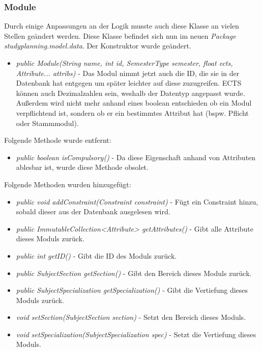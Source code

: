 \documentclass[parskip=full]{scrartcl}
\begin{document}
			\subsubsection{Module}
				Durch einige Anpassungen an der Logik musste auch diese Klasse an vielen Stellen geändert werden.
				Diese Klasse befindet sich nun im neuen \textit{Package studyplanning.model.data}.
				Der Konstruktor wurde geändert.
				\begin{itemize}
					\item \textit{public Module(String name, int id, SemesterType semester, float ects, Attribute... attribs)} - Das Modul nimmt jetzt auch die ID, die sie in der Datenbank hat entgegen um später leichter auf diese zuzugreifen. ECTS können auch Dezimalzahlen sein, weshalb der Datentyp angepasst wurde. Außerdem wird nicht mehr anhand eines boolean entschieden ob ein Modul verpflichtend ist, sondern ob er ein bestimmtes Attribut hat (bspw. Pflicht oder Stammmodul).
				\end{itemize}
			
				Folgende Methode wurde entfernt:
				\begin{itemize}
					\item \textit{public boolean isCompulsory()} - Da diese Eigenschaft anhand von Attributen ablesbar ist, wurde diese Methode obsolet.
				\end{itemize}
			
				Folgende Methoden wurden hinzugefügt:
				\begin{itemize}
					\item \textit{public void addConstraint(Constraint constraint)} - Fügt ein Constraint hinzu, sobald dieser aus der Datenbank ausgelesen wird.
					\item \textit{public ImmutableCollection<Attribute> getAttributes()} - Gibt alle Attribute dieses Moduls zurück.
					\item \textit{public int getID()} - Gibt die ID des Moduls zurück.
					\item \textit{public SubjectSection getSection()} - Gibt den Bereich dieses Moduls zurück.
					\item \textit{public SubjectSpecialization getSpecialization()} - Gibt die Vertiefung dieses Moduls zurück.
					\item \textit{void setSection(SubjectSection section)} - Setzt den Bereich dieses Moduls.
					\item \textit{void setSpecialization(SubjectSpecialization spec)} - Setzt die Vertiefung dieses Moduls.
				\end{itemize}
			
\end{document}
